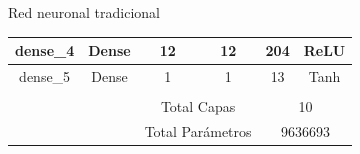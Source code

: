 \documentclass[10pt]{beamer}
\begin{document}
\begin{frame}{Red neuronal tradicional}
\begin{table}[]
{\begin{tabular}{@{}cccccc@{}}
        \multicolumn{1}{|c|}{dense\_4}      & \multicolumn{1}{c|}{Dense}         & \multicolumn{1}{c|}{12}                                                                    & \multicolumn{1}{c|}{12}                                                                        & \multicolumn{1}{c|}{204}                                                                        & \multicolumn{1}{c|}{ReLU}                                                                      \\ \midrule
        \multicolumn{1}{|c|}{dense\_5}      & \multicolumn{1}{c|}{Dense}         & \multicolumn{1}{c|}{1}                                                                     & \multicolumn{1}{c|}{1}                                                                         & \multicolumn{1}{c|}{13}                                                                         & \multicolumn{1}{c|}{Tanh}                                                                      \\ \midrule
                                            &                                    &                                                                                            &                                                                                                &                                                                                                 &                                                                                                \\ \cmidrule(l){3-6} 
                                            & \multicolumn{1}{c|}{}              & \multicolumn{2}{c|}{Total Capas}                                                                                                                                                            & \multicolumn{2}{c|}{10}                                                                                                                                                                          \\ \cmidrule(l){3-6} 
                                            & \multicolumn{1}{c|}{}              & \multicolumn{2}{c|}{Total Parámetros}                                                                                                                                                       & \multicolumn{2}{c|}{9636693}                                                                                                                                                                     \\ \cmidrule(l){3-6} 
        \end{tabular}%
        }
    \end{table}
\end{frame}
\end{document}
